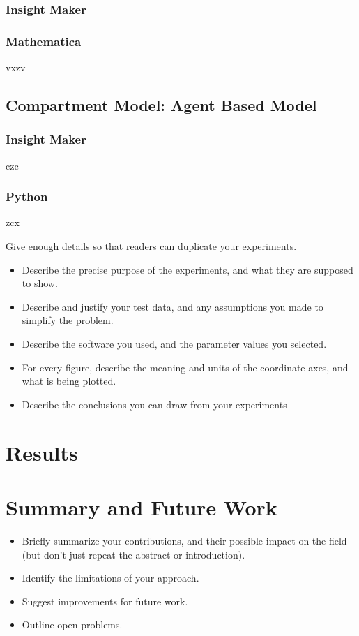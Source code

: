 \documentclass[10pt]{article}
\begin{document}
\subsubsection{Insight Maker}

\subsubsection{Mathematica}
vxzv

\subsection{Compartment Model: Agent Based Model}


\subsubsection{Insight Maker}
czc

\subsubsection{Python}
zcx


Give enough details so that readers can duplicate your experiments.

\begin{itemize}
\item Describe the precise purpose of the experiments, and what they 
are supposed to show.

\item Describe and justify your test data, and any assumptions you made to 
simplify the problem.

\item Describe the software you used, and the 
parameter values you selected.

\item 
For every figure, describe the meaning and units of the coordinate axes, 
and what is being plotted.

\item Describe the conclusions you can draw from your experiments
\end{itemize}
%
%
%
%
%
%
%
%
%
\section{Results}\label{sec:Results}
%
%
%
%
%
%
%
%
%


\section{Summary and Future Work}\label{sec:Summary}
\begin{itemize}
\item Briefly summarize your contributions, and their possible
impact on the field (but don't just repeat the abstract or introduction).
\item Identify the limitations of your approach.
\item Suggest improvements for future work.
\item Outline open problems.
\end{itemize}


\end{document}
